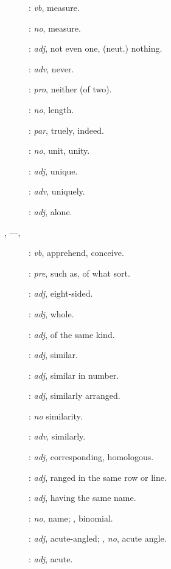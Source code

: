 {\begin{description}
\item[]: {\em vb}, measure.
\item[]: {\em no}, measure.
\item[]: {\em adj}, not even one, (neut.) nothing.
\item[]: {\em adv}, never.
\item[]: {\em pro}, neither (of two).
\item[]: {\em no}, length.
\item[]: {\em par}, truely, indeed.
\item[]: {\em no}, unit, unity.
\item[]: {\em adj}, unique.
\item[]: {\em adv}, uniquely.
\item[]: {\em adj}, alone.
\item[, ---, ]: {\em vb}, apprehend, conceive.
\item[]: {\em pre}, such as, of what sort.
\item[]: {\em adj}, eight-sided.
\item[]: {\em adj}, whole.
\item[]: {\em adj}, of the same kind.
\item[]: {\em adj}, similar.
\item[]: {\em adj}, similar in number.
\item[]: {\em adj}, similarly arranged.
\item[]: {\em no} similarity.
\item[]: {\em adv}, similarly.
\item[]: {\em adj}, corresponding, homologous.
\item[]: {\em adj}, ranged in the same row or line.
\item[]: {\em adj}, having the same name.
\item[]: {\em no}, name; ,
binomial.
\item[]: {\em adj}, acute-angled; ,
{\em no}, acute angle.
\item[]: {\em adj}, acute.

\end{description}}
